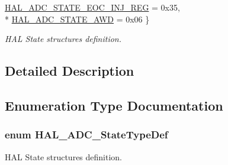 \begin{DoxyCompactItemize}
\hyperlink{group___a_d_c___exported___types_ggafd66db22d830742b403c1f7f32d4630ea39ef50d09363cf94db58782b8eb0b801}{H\+A\+L\+\_\+\+A\+D\+C\+\_\+\+S\+T\+A\+T\+E\+\_\+\+E\+O\+C\+\_\+\+I\+N\+J\+\_\+\+R\+EG} = 0x35, 
\\*
\hyperlink{group___a_d_c___exported___types_ggafd66db22d830742b403c1f7f32d4630eaedb3b42980def95403baae66c3b5a0c9}{H\+A\+L\+\_\+\+A\+D\+C\+\_\+\+S\+T\+A\+T\+E\+\_\+\+A\+WD} = 0x06
 \}\begin{DoxyCompactList}\small\item\em H\+AL State structures definition. \end{DoxyCompactList}
\end{DoxyCompactItemize}


\subsection{Detailed Description}


\subsection{Enumeration Type Documentation}
\subsubsection[{\texorpdfstring{H\+A\+L\+\_\+\+A\+D\+C\+\_\+\+State\+Type\+Def}{HAL_ADC_StateTypeDef}}]{\setlength{\rightskip}{0pt plus 5cm}enum {\bf H\+A\+L\+\_\+\+A\+D\+C\+\_\+\+State\+Type\+Def}}\hypertarget{group___a_d_c___exported___types_gafd66db22d830742b403c1f7f32d4630e}{}\label{group___a_d_c___exported___types_gafd66db22d830742b403c1f7f32d4630e}


H\+AL State structures definition. 

